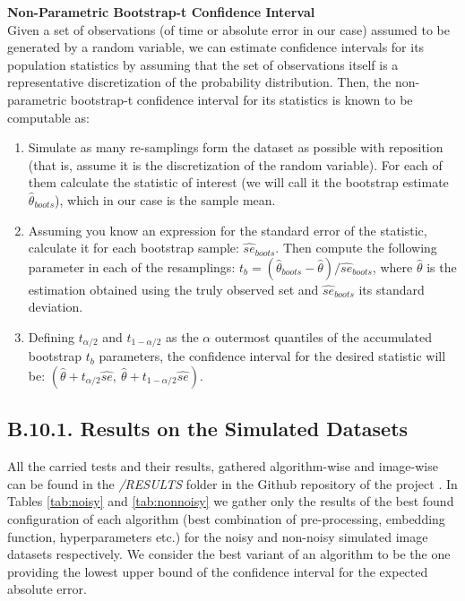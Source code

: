 \documentclass[11pt, a4paper, twoside]{article} %
\DeclareRobustCommand{\mybox}[2][gray!10]{%
\begin{tcolorbox}[   %
        left=0.2cm,
        right=0.2cm,
        top=0.15cm,
        bottom=0.15cm,
        colback=#1,
        colframe=#1,
        width=\dimexpr\textwidth\relax, 
        enlarge left by=0mm,
        boxsep=5pt,
        arc=0pt,outer arc=0pt,
        ]
        #2
\end{tcolorbox}
}
\begin{document}
\mybox{{\bf Non-Parametric Bootstrap-t Confidence Interval \vspace{0.12cm}}\\
Given a set of observations (of time or absolute error in our case) assumed to be generated by a random variable, we can estimate confidence intervals for its population statistics by assuming that the set of observations itself is a representative discretization of the probability distribution. Then, the non-parametric bootstrap-t confidence interval for its statistics is known  \cite{boots} to be computable as:\vspace{-0.15cm}
\begin{enumerate}
\item Simulate as many re-samplings form the dataset as possible with reposition (that is, assume it is the discretization of the random variable). For each of them calculate the statistic of interest (we will call it the bootstrap estimate $\hat{\theta}_{boots}$), which in our case is the sample mean.
\item  Assuming you know an expression for the standard error of the statistic, calculate it for each bootstrap sample: $\hat{se}_{boots}$. Then compute the following parameter in each of the resamplings: $t_b=(\hat{\theta}_{boots}-\hat{\theta})/\hat{se}_{boots}$, where $\hat{\theta}$ is the estimation obtained using the truly observed set and $\hat{se}_{boots}$ its standard deviation.
\item  Defining $t_{\alpha/2}$ and $t_{1-\alpha/2}$ as the $\alpha$ outermost quantiles of the accumulated bootstrap $t_b$
parameters, the confidence interval for the desired statistic will be: $(\hat{\theta}+t_{\alpha/2}\hat{se},\ \hat{\theta}+t_{1-\alpha/2}\hat{se})$.
\end{enumerate}
}\vspace{-0.2cm}

\subsection*{B.10.1. Results on the Simulated Datasets}\vspace{-0.2cm}
All the carried tests and their results, gathered algorithm-wise and image-wise can be found in the {\em /RESULTS} folder in the Github repository of the project \cite{github}. In Tables \ref{tab:noisy} and \ref{tab:nonnoisy} we gather only the results of the best found configuration of each algorithm (best combination of pre-processing, embedding function, hyperparameters etc.) for the noisy and non-noisy simulated image datasets respectively. We consider the best variant of an algorithm to be the one providing the lowest upper bound of the confidence interval for the expected absolute error.\vspace{0.2cm} 
\end{document}
